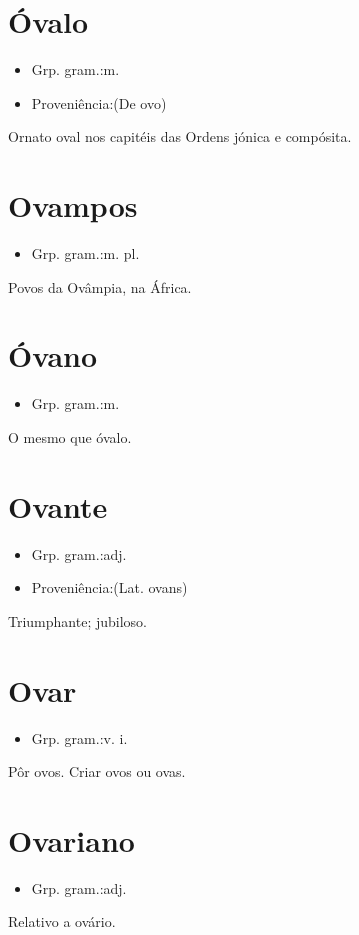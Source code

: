 \section{Óvalo}
\begin{itemize}
\item {Grp. gram.:m.}
\end{itemize}
\begin{itemize}
\item {Proveniência:(De \textunderscore ovo\textunderscore )}
\end{itemize}
Ornato oval nos capitéis das Ordens jónica e compósita.
\section{Ovampos}
\begin{itemize}
\item {Grp. gram.:m. pl.}
\end{itemize}
Povos da Ovâmpia, na África.
\section{Óvano}
\begin{itemize}
\item {Grp. gram.:m.}
\end{itemize}
O mesmo que \textunderscore óvalo\textunderscore .
\section{Ovante}
\begin{itemize}
\item {Grp. gram.:adj.}
\end{itemize}
\begin{itemize}
\item {Proveniência:(Lat. \textunderscore ovans\textunderscore )}
\end{itemize}
Triumphante; jubiloso.
\section{Ovar}
\begin{itemize}
\item {Grp. gram.:v. i.}
\end{itemize}
Pôr ovos.
Criar ovos ou ovas.
\section{Ovariano}
\begin{itemize}
\item {Grp. gram.:adj.}
\end{itemize}
Relativo a ovário.

